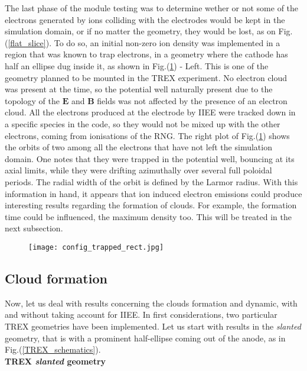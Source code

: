 The last phase of the module testing was to determine wether or not some of the electrons generated by ions colliding with the electrodes would be kept in the simulation domain, or if no matter the geometry, they would be lost, as on Fig.(\ref{flat_slice}). To do so, an initial non-zero ion density was implemented in a region that was known to trap electrons, in a geometry where the cathode has half an ellipse dug inside it, as shown in Fig.(\ref{config_trapped}) - Left. This is one of the geometry planned to be mounted in the TREX experiment. No electron cloud was present at the time, so the potential well naturally present due to the topology of the $\mathbf{E}$ and $\mathbf{B}$ fields was not affected by the presence of an electron cloud. All the electrons produced at the electrode by IIEE were tracked down in a specific species in the code, so they would not be mixed up with the other electrons, coming from ionisations of the RNG. The right plot of Fig.(\ref{config_trapped}) shows the orbits of two among all the electrons that have not left the simulation domain. One notes that they were trapped in the potential well, bouncing at its axial limits, while they were drifting azimuthally over several full poloidal periods. The radial width of the orbit is defined by the Larmor radius. With this information in hand, it appears that ion induced electron emissions could produce interesting results regarding the formation of clouds. For example, the formation time could be influenced, the maximum density too. This will be treated in the next subsection.\\

\begin{figure}[h!]
\centering
	\texttt{[image: config\_trapped\_rect.jpg]}
	\caption{\label{config_trapped} }
\end{figure}  

\subsection{Cloud formation}

Now, let us deal with results concerning the clouds formation and dynamic, with and without taking account for IIEE. In first considerations, two particular TREX geometries have been implemented. Let us start with results in the \emph{slanted} geometry, that is with a prominent half-ellipse coming out of the anode, as in Fig.({\ref{TREX_schematics}}).\\

\textbf{TREX \emph{slanted} geometry}\\

